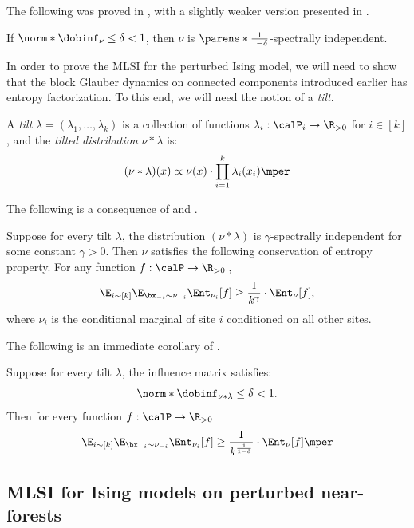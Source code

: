 \documentclass[11pt,letterpaper]{article}
\begin{document}
The following was proved in \cite{AJKPV24}, with a slightly weaker version presented in \cite{Liu21,BCCPSV22}.
\begin{theorem}    \label{thm:dobrushin-to-specind}
    If $\norm*{\dobinf_{\nu}} \le \delta < 1$, then $\nu$ is $\parens*{\frac{1}{1-\delta}}$-spectrally independent.
\end{theorem}

In order to prove the MLSI for the perturbed Ising model, we will need to show that the block Glauber dynamics on connected components introduced earlier has entropy factorization. 
To this end, we will need the notion of a \emph{tilt}.
\begin{definition}[Tilts]
    A \emph{tilt} $\lambda = (\lambda_1,\dots,\lambda_k)$ is a collection of functions $\lambda_i:\calP_i\to\R_{> 0}$ for $i \in [k]$, and the \emph{tilted distribution} $\nu\ast\lambda$ is:
    \[
        (\nu\ast\lambda)(x) \propto \nu(x)\cdot \prod_{i=1}^k \lambda_i(x_i)\mper
    \]
\end{definition}

The following is a consequence of \cite[Theorem 4 and Theorem 5]{AJKPV21a} and \cite[Proposition 20 and Remark 70]{AASV21}.
\begin{lemma}   \label{thm:specind-to-entind}
    Suppose for every tilt $\lambda$, the distribution $(\nu\ast\lambda)$ is $\gamma$-spectrally independent for some constant $\gamma > 0$. Then $\nu$ satisfies the following conservation of entropy property.
    For any function $f:\calP\to\R_{> 0}$\,,
    \[
        \E_{i\sim[k]}\E_{\bx_{-i}\sim\nu_{-i}} \Ent_{\nu_i}[f] \ge \frac{1}{k^{\gamma}}\cdot\Ent_{\nu}[f],
    \]
    where $\nu_i$ is the conditional marginal of site $i$ conditioned on all other sites.
\end{lemma}

The following is an immediate corollary of .
\begin{corollary}   \label{cor:entind-dob}
    Suppose for every tilt $\lambda$, the influence matrix satisfies:
    \[
        \norm*{\dobinf_{\nu\ast\lambda}} \le \delta < 1.
    \]
    Then for every function $f:\calP\to\R_{> 0}$\mcom
    \[
        \E_{i\sim[k]}\E_{\bx_{-i}\sim\nu_{-i}} \Ent_{\nu_i}[f] \ge \frac{1}{k^{\frac{1}{1-\delta}}}\cdot\Ent_{\nu}[f]\mper
    \]
\end{corollary}

\subsection{MLSI for Ising models on perturbed near-forests} \label{sec:perturbed-near-forest}
\end{document}
